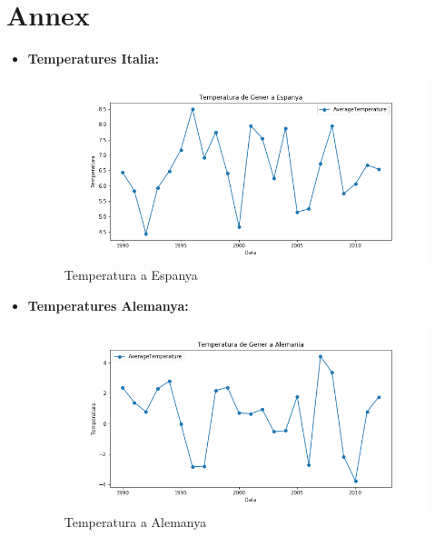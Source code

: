 \documentclass[10pt,a4paper,twocolumn,twoside]{article}
\begin{document}
\section{Annex}
 \begin{itemize}
\item \textbf{Temperatures Italia:}
\begin{figure}[!h]
\centering
	\includegraphics[width=1\textwidth]{../img/tempSpain}
	\caption{Temperatura a Espanya}
	\label{fig-tempSpain}
\end{figure}
\item \textbf{Temperatures Alemanya:}
\begin{figure}[!h]
\centering
	\includegraphics[width=1\textwidth]{../img/tempGermany}
	\caption{Temperatura a Alemanya}
	\label{fig-tempGerm}
\end{figure}
\end{itemize}
\end{document}

